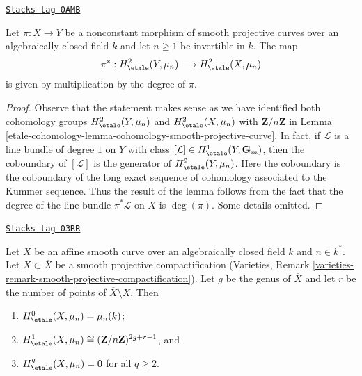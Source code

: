 \begin{lemma}
\label{etale-cohomology-lemma-pullback-on-h2-curve}
\href{https://stacks.math.columbia.edu/tag/0AMB}{\texttt{Stacks tag 0AMB}}

Let $\pi : X \to Y$ be a nonconstant morphism of smooth projective curves
over an algebraically closed field $k$ and let $n \geq 1$ be invertible in $k$.
The map
$$
\pi^* : H^2_\etale(Y, \mu_n) \longrightarrow H^2_\etale(X, \mu_n)
$$
is given by multiplication by the degree of $\pi$.
\end{lemma}

\begin{proof}
Observe that the statement makes sense as we have identified both
cohomology groups $ H^2_\etale(Y, \mu_n)$ and $H^2_\etale(X, \mu_n)$
with $\mathbf{Z}/n\mathbf{Z}$ in
Lemma \ref{etale-cohomology-lemma-cohomology-smooth-projective-curve}.
In fact, if $\mathcal{L}$ is a line bundle of degree $1$
on $Y$ with class $[\mathcal{L}] \in H^1_\etale(Y, \mathbf{G}_m)$,
then the coboundary of $[\mathcal{L}]$ is the generator of
$H^2_\etale(Y, \mu_n)$. Here the coboundary is the coboundary
of the long exact sequence of cohomology associated to the Kummer
sequence. Thus the result of the lemma follows from the fact that
the degree of the line bundle $\pi^*\mathcal{L}$ on $X$ is $\deg(\pi)$.
Some details omitted.
\end{proof}

\begin{lemma}
\label{etale-cohomology-lemma-vanishing-cohomology-mu-smooth-curve}
\href{https://stacks.math.columbia.edu/tag/03RR}{\texttt{Stacks tag 03RR}}

Let $X$ be an affine smooth curve over an algebraically closed field $k$ and
$n \in k^*$. Let $X \subset \overline{X}$ be a smooth projective
compactification
(Varieties, Remark \ref{varieties-remark-smooth-projective-compactification}).
Let $g$ be the genus of $\overline{X}$ and let $r$ be the number of
points of $\overline{X} \setminus X$. Then
\begin{enumerate}
\item $H_\etale^0(X, \mu_n) = \mu_n(k)$;
\item $H_\etale^1(X, \mu_n) \cong (\mathbf{Z}/n\mathbf{Z})^{2g+r-1}$, and
\item $H_\etale^q(X, \mu_n) = 0$ for all $q \geq 2$.
\end{enumerate}
\end{lemma}

